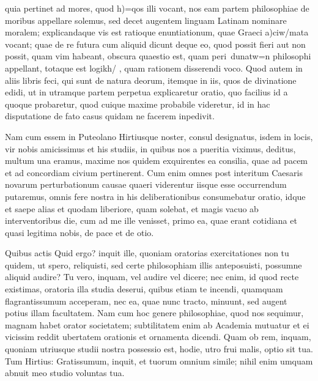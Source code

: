 
 quia pertinet ad mores, quod h)=qos illi vocant, nos eam partem philosophiae de moribus appellare solemus, sed decet augentem linguam Latinam nominare moralem; explicandaque vis est ratioque enuntiationum, quae Graeci a)ciw/mata vocant; quae de re futura cum aliquid dicunt deque eo, quod possit fieri aut non possit, quam vim habeant, obscura quaestio est, quam peri\ dunatw=n philosophi appellant, totaque est logikh/ , quam rationem disserendi voco. Quod autem in aliis libris feci, qui sunt de natura deorum, itemque in iis, quos de divinatione edidi, ut in utramque partem perpetua explicaretur oratio, quo facilius id a quoque probaretur, quod cuique maxime probabile videretur, id in hac disputatione de fato casus quidam ne facerem inpedivit.

 Nam cum essem in Puteolano Hirtiusque noster, consul designatus, isdem in locis, vir nobis amicissimus et his studiis, in quibus nos a pueritia viximus, deditus, multum una eramus, maxime nos quidem exquirentes ea consilia, quae ad pacem et ad concordiam civium pertinerent. Cum enim omnes post interitum Caesaris novarum perturbationum causae quaeri viderentur iisque esse occurrendum putaremus, omnis fere nostra in his deliberationibus consumebatur oratio, idque et saepe alias et quodam liberiore, quam solebat, et magis vacuo ab interventoribus die, cum ad me ille venisset, primo ea, quae erant cotidiana et quasi legitima nobis, de pace et de otio.

 Quibus actis Quid ergo? inquit ille, quoniam oratorias exercitationes non tu quidem, ut spero, reliquisti, sed certe philosophiam illis anteposuisti, possumne aliquid audire? Tu vero, inquam, vel audire vel dicere; nec enim, id quod recte existimas, oratoria illa studia deserui, quibus etiam te incendi, quamquam flagrantissumum acceperam, nec ea, quae nunc tracto, minuunt, sed augent potius illam facultatem. Nam cum hoc genere philosophiae, quod nos sequimur, magnam habet orator societatem; subtilitatem enim ab Academia mutuatur et ei vicissim reddit ubertatem orationis et ornamenta dicendi. Quam ob rem, inquam, quoniam utriusque studii nostra possessio est, hodie, utro frui malis, optio sit tua. Tum Hirtius: Gratissumum, inquit, et tuorum omnium simile; nihil enim umquam abnuit meo studio voluntas tua.

